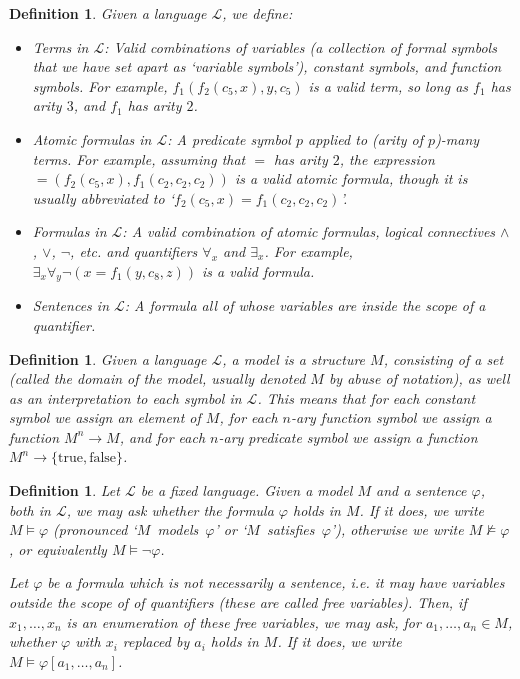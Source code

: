 \documentclass{article}
\newtheorem{definition}[theorem]{Definition}
\theoremstyle{nonumberplain}
\newcommand{\Lang}{\mathcal{L}}
\begin{document}
\begin{definition}\label{def:formula}
Given a language $\Lang$, we define:
\begin{itemize}
\item Terms in $\Lang$: Valid combinations of variables (a collection of formal symbols that we have set apart as `variable symbols'), constant symbols, and function symbols. For example, $f_1(f_2(c_5, x), y, c_5)$ is a valid term, so long as $f_1$ has arity $3$, and $f_1$ has arity $2$.

\item Atomic formulas in $\Lang$: A predicate symbol $p$ applied to (arity of $p$)-many terms. For example, assuming that $=$ has arity $2$, the expression $=(f_2(c_5,x), f_1(c_2,c_2,c_2))$ is a valid atomic formula, though it is usually abbreviated to `$f_2(c_5,x) = f_1(c_2,c_2,c_2)$'.

\item Formulas in $\Lang$: A valid combination of atomic formulas, logical connectives $\land$, $\lor$, $\neg$, etc. and quantifiers $\forall_x$ and $\exists_x$. For example, $\exists_x \forall_y \neg(x = f_1(y, c_8,z))$ is a valid formula.

\item Sentences in $\Lang$: A formula all of whose variables are inside the scope of a quantifier.
\end{itemize}
\end{definition}

\begin{definition}
Given a language $\Lang$, a \emph{model} is a structure $M$, consisting of a set (called the domain of the model, usually denoted $M$ by abuse of notation), as well as an interpretation to each symbol in $\Lang$. This means that for each constant symbol we assign an element of $M$, for each $n$-ary function symbol we assign a function $M^n \to M$, and for each $n$-ary predicate symbol we assign a function $M^n \to \{\text{true}, \text{false}\}$.
\end{definition}

\begin{definition}
Let $\Lang$ be a fixed language. Given a model $M$ and a sentence $\varphi$, both in $\Lang$, we may ask whether the formula $\varphi$ holds in $M$. If it does, we write $M \vDash \varphi$ (pronounced `$M$~models~$\varphi$' or `$M$~satisfies~$\varphi$'), otherwise we write $M \nvDash \varphi$, or equivalently $M \vDash \neg\varphi$.

Let $\varphi$ be a formula which is not necessarily a sentence, i.e. it may have variables outside the scope of of quantifiers (these are called free variables). Then, if $x_1, \dots, x_n$ is an enumeration of these free variables, we may ask, for $a_1, \dots, a_n \in M$, whether $\varphi$ with $x_i$ replaced by $a_i$ holds in $M$. If it does, we write $M \vDash \varphi[a_1, \dots, a_n]$.
\end{definition}
\end{document}
